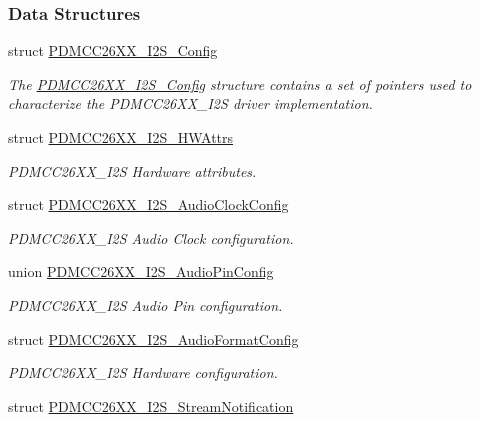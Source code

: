 \subsubsection*{Data Structures}
\begin{DoxyCompactItemize}
\item 
struct \hyperlink{struct_p_d_m_c_c26_x_x___i2_s___config}{P\+D\+M\+C\+C26\+X\+X\+\_\+\+I2\+S\+\_\+\+Config}
\begin{DoxyCompactList}\small\item\em The \hyperlink{struct_p_d_m_c_c26_x_x___i2_s___config}{P\+D\+M\+C\+C26\+X\+X\+\_\+\+I2\+S\+\_\+\+Config} structure contains a set of pointers used to characterize the P\+D\+M\+C\+C26\+X\+X\+\_\+\+I2\+S driver implementation. \end{DoxyCompactList}\item 
struct \hyperlink{struct_p_d_m_c_c26_x_x___i2_s___h_w_attrs}{P\+D\+M\+C\+C26\+X\+X\+\_\+\+I2\+S\+\_\+\+H\+W\+Attrs}
\begin{DoxyCompactList}\small\item\em P\+D\+M\+C\+C26\+X\+X\+\_\+\+I2\+S Hardware attributes. \end{DoxyCompactList}\item 
struct \hyperlink{struct_p_d_m_c_c26_x_x___i2_s___audio_clock_config}{P\+D\+M\+C\+C26\+X\+X\+\_\+\+I2\+S\+\_\+\+Audio\+Clock\+Config}
\begin{DoxyCompactList}\small\item\em P\+D\+M\+C\+C26\+X\+X\+\_\+\+I2\+S Audio Clock configuration. \end{DoxyCompactList}\item 
union \hyperlink{union_p_d_m_c_c26_x_x___i2_s___audio_pin_config}{P\+D\+M\+C\+C26\+X\+X\+\_\+\+I2\+S\+\_\+\+Audio\+Pin\+Config}
\begin{DoxyCompactList}\small\item\em P\+D\+M\+C\+C26\+X\+X\+\_\+\+I2\+S Audio Pin configuration. \end{DoxyCompactList}\item 
struct \hyperlink{struct_p_d_m_c_c26_x_x___i2_s___audio_format_config}{P\+D\+M\+C\+C26\+X\+X\+\_\+\+I2\+S\+\_\+\+Audio\+Format\+Config}
\begin{DoxyCompactList}\small\item\em P\+D\+M\+C\+C26\+X\+X\+\_\+\+I2\+S Hardware configuration. \end{DoxyCompactList}\item 
struct \hyperlink{struct_p_d_m_c_c26_x_x___i2_s___stream_notification}{P\+D\+M\+C\+C26\+X\+X\+\_\+\+I2\+S\+\_\+\+Stream\+Notification}

\end{DoxyCompactItemize}
